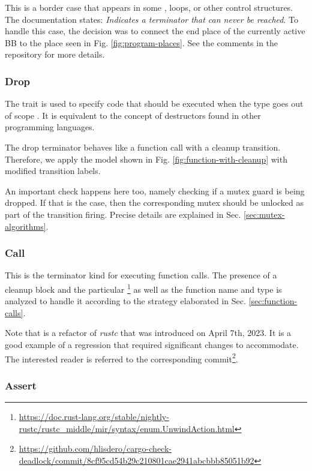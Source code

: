 This is a border case that appears
in some ,  loops, or other control structures.
The documentation states: \emph{Indicates a terminator that can never be reached}.
To handle this case, the decision was to connect
the end place of the currently active \acrshort{BB}
to the  place seen in Fig. \ref{fig:program-places}.
See the comments in the repository for more details.

\subsubsection{Drop}

The  trait is used to specify code that should be executed
when the type goes out of scope \cite[Chap. 15.3]{rust-book}.
It is equivalent to the concept of destructors found in other programming languages.

The drop terminator behaves like a function call with a cleanup transition.
Therefore, we apply the model shown in Fig. \ref{fig:function-with-cleanup}
with modified transition labels.

An important check happens here too, namely checking if a mutex guard is being dropped.
If that is the case, then the corresponding mutex should be unlocked
as part of the transition firing.
Precise details are explained in Sec. \ref{sec:mutex-algorithms}.

\subsubsection{Call}

This is the terminator kind for executing function calls.
The presence of a cleanup block and the particular
\footnote{\url{https://doc.rust-lang.org/stable/nightly-rustc/rustc_middle/mir/syntax/enum.UnwindAction.html}}
as well as the function name and type is analyzed to handle it
according to the strategy elaborated in Sec. \ref{sec:function-calls}.

Note that  is a refactor of \emph{rustc}
that was introduced on April 7th, 2023.
It is a good example of a regression that required significant changes to accommodate.
The interested reader is referred to the corresponding
commit\footnote{\url{https://github.com/hlisdero/cargo-check-deadlock/commit/8cf95cd54b29c210801cae2941abcbbb85051b92}}.

\subsubsection{Assert}

